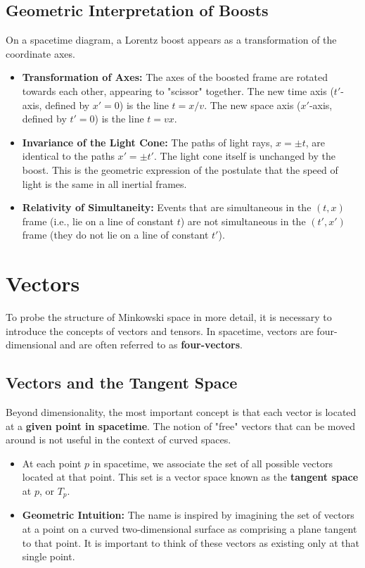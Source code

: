 \documentclass[11pt, a4paper]{report}
\begin{document}
\subsection*{Geometric Interpretation of Boosts}

On a spacetime diagram, a Lorentz boost appears as a transformation of the coordinate axes.

\begin{itemize}
    \item \textbf{Transformation of Axes:} The axes of the boosted frame are rotated towards each other, appearing to "scissor" together. The new time axis ($t'$-axis, defined by $x'=0$) is the line $t = x/v$. The new space axis ($x'$-axis, defined by $t'=0$) is the line $t = vx$.
    \item \textbf{Invariance of the Light Cone:} The paths of light rays, $x = \pm t$, are identical to the paths $x' = \pm t'$. The light cone itself is unchanged by the boost. This is the geometric expression of the postulate that the speed of light is the same in all inertial frames.
    \item \textbf{Relativity of Simultaneity:} Events that are simultaneous in the $(t,x)$ frame (i.e., lie on a line of constant $t$) are not simultaneous in the $(t', x')$ frame (they do not lie on a line of constant $t'$).
\end{itemize}

\section{Vectors}

To probe the structure of Minkowski space in more detail, it is necessary to introduce the concepts of vectors and tensors. In spacetime, vectors are four-dimensional and are often referred to as \textbf{four-vectors}.

\subsection*{Vectors and the Tangent Space}

Beyond dimensionality, the most important concept is that each vector is located at a \textbf{given point in spacetime}. The notion of "free" vectors that can be moved around is not useful in the context of curved spaces.

\begin{itemize}
    \item At each point $p$ in spacetime, we associate the set of all possible vectors located at that point. This set is a vector space known as the \textbf{tangent space} at $p$, or $T_p$.
    \item \textbf{Geometric Intuition:} The name is inspired by imagining the set of vectors at a point on a curved two-dimensional surface as comprising a plane tangent to that point. It is important to think of these vectors as existing only at that single point.
\end{itemize}
\end{document}
